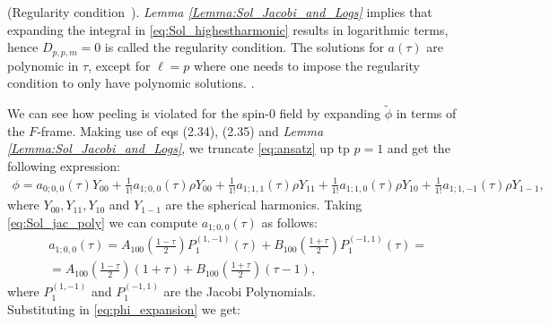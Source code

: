 \begin{remark}\label{Remark:logfreeRemark}(Regularity condition~\cite{MinMacKro22}).
  \emph{Lemma \ref{Lemma:Sol_Jacobi_and_Logs}} implies that expanding the integral in \eqref{eq:Sol_highestharmonic} results in logarithmic terms, hence
  $D_{p,p,m} = 0$ is called the regularity condition. The solutions for
  $a(\tau)$ are polynomic in $\tau$, except for $\ell = p$ where one needs
  to impose the regularity condition to only have polynomic
  solutions. \cite{MinMacKro22}.
\end{remark}
\noindent
We can see how peeling is violated for the spin-0 field by expanding $\tilde{\phi}$ in terms of the $F$-frame. Making use of eqs (2.34), (2.35) and \emph{Lemma \ref{Lemma:Sol_Jacobi_and_Logs}}, we truncate \eqref{eq:ansatz} up tp $p = 1$ and get the following expression:
\begin{align}\label{eq:phi_expansion}
  \phi = a_{0;0,0}(\tau) Y_{00}+\frac{1}{1!} a_{1;0,0}(\tau) \rho Y_{00}+\frac{1}{1!} a_{1;1,1}(\tau) \rho Y_{11}+\frac{1}{1!} a_{1;1,0}(\tau) \rho Y_{10} + \frac{1}{1!} a_{1;1,-1}(\tau) \rho Y_{1-1},
\end{align}
where $Y_{00}, Y_{11}, Y_{10}$ and $Y_{1-1}$ are the spherical harmonics. Taking \eqref{eq:Sol_jac_poly} we can compute $a_{1;0,0}(\tau)$ as follows:
\begin{align}\label{eq:a100}
  & a_{1 ; 0,0}(\tau) = A_{100}\left(\frac{1-\tau}{2}\right) P_{1}^{(1,-1)}(\tau)+B_{100}\left(\frac{1+\tau}{2}\right) P_{1}^{(-1,1)}(\tau) = \nonumber \\
  & = A_{100}\left(\frac{1-\tau}{2}\right)(1+\tau)+B_{100}\left(\frac{1+\tau}{2}\right)(\tau-1),
\end{align}
where $P_{1}^{(1,-1)}$ and $P_{1}^{(-1,1)}$ are the Jacobi Polynomials.\\
Substituting in \eqref{eq:phi_expansion} we get:
